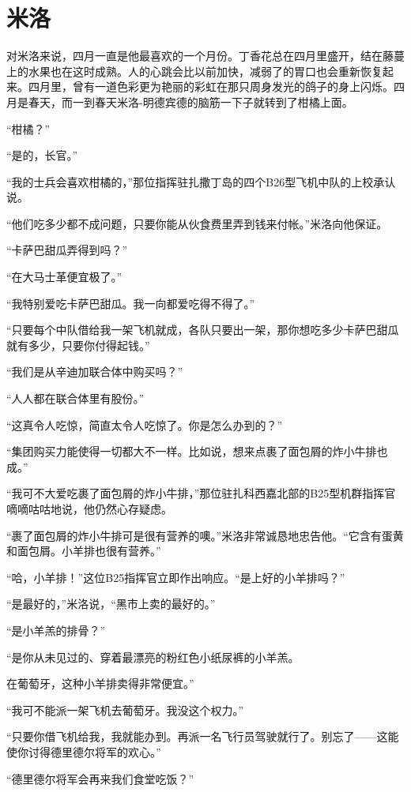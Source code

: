 \chapter{米洛}
 
    对米洛来说，四月一直是他最喜欢的一个月份。丁香花总在四月里盛开，结在藤蔓上的水果也在这时成熟。人的心跳会比以前加快，减弱了的胃口也会重新恢复起来。四月里，曾有一道色彩更为艳丽的彩虹在那只周身发光的鸽子的身上闪烁。四月是春天，而一到春天米洛-明德宾德的脑筋一下子就转到了柑橘上面。

    “柑橘？”

    “是的，长官。”

    “我的士兵会喜欢柑橘的，”那位指挥驻扎撒丁岛的四个B26型飞机中队的上校承认说。

    “他们吃多少都不成问题，只要你能从伙食费里弄到钱来付帐。”米洛向他保证。

    “卡萨巴甜瓜弄得到吗？”

    “在大马士革便宜极了。”

    “我特别爱吃卡萨巴甜瓜。我一向都爱吃得不得了。”

    “只要每个中队借给我一架飞机就成，各队只要出一架，那你想吃多少卡萨巴甜瓜就有多少，只要你付得起钱。”

    “我们是从辛迪加联合体中购买吗？”

    “人人都在联合体里有股份。”

    “这真令人吃惊，简直太令人吃惊了。你是怎么办到的？”

    “集团购买力能使得一切都大不一样。比如说，想来点裹了面包屑的炸小牛排也成。”

    “我可不大爱吃裹了面包屑的炸小牛排，”那位驻扎科西嘉北部的B25型机群指挥官嘀嘀咕咕地说，他仍然心存疑虑。

    “裹了面包屑的炸小牛排可是很有营养的噢。”米洛非常诚恳地忠告他。“它含有蛋黄和面包屑。小羊排也很有营养。”

    “哈，小羊排！”这位B25指挥官立即作出响应。“是上好的小羊排吗？”

    “是最好的，”米洛说，“黑市上卖的最好的。”

    “是小羊羔的排骨？”

    “是你从未见过的、穿着最漂亮的粉红色小纸尿裤的小羊羔。

    在葡萄牙，这种小羊排卖得非常便宜。”

    “我可不能派一架飞机去葡萄牙。我没这个权力。”

    “只要你借飞机给我，我就能办到。再派一名飞行员驾驶就行了。别忘了——这能使你讨得德里德尔将军的欢心。”

    “德里德尔将军会再来我们食堂吃饭？”

